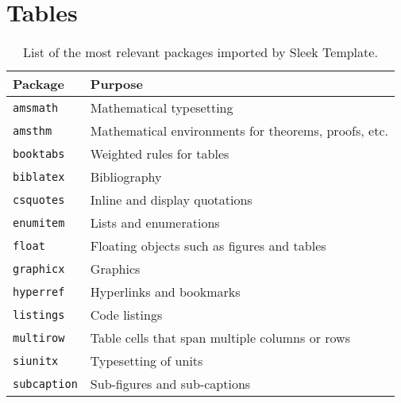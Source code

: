 \documentclass[a4paper, 12pt]{report}
\begin{document}
    \printbibliography

    \appendix

    \chapter{Tables} \label{chap:Tables}

    \begin{table}[h]
        \centering
        \begin{tabular}{ll}
            \toprule
            \textbf{Package} & \textbf{Purpose} \\
            \midrule
            \texttt{amsmath} & Mathematical typesetting \\
            \texttt{amsthm} & Mathematical environments for theorems, proofs, etc. \\
            \texttt{booktabs} & Weighted rules for tables \\
            \texttt{biblatex} & Bibliography \\
            \texttt{csquotes} & Inline and display quotations \\
            \texttt{enumitem} & Lists and enumerations \\
            \texttt{float} & Floating objects such as figures and tables \\
            \texttt{graphicx} & Graphics \\
            \texttt{hyperref} & Hyperlinks and bookmarks \\
            \texttt{listings} & Code listings \\
            \texttt{multirow} & Table cells that span multiple columns or rows \\
            \texttt{siunitx} & Typesetting of units  \\
            \texttt{subcaption} & Sub-figures and sub-captions \\
            \bottomrule
        \end{tabular}
        \caption{List of the most relevant packages imported by Sleek Template.}
        \label{tab:sleek_relevant_packages}
    \end{table}
\end{document}

